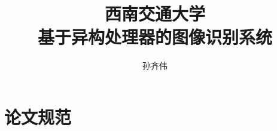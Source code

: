 \documentclass[bachelor]{swjtuthesis}
\title{西南交通大学\\基于异构处理器的图像识别系统}
\author{孙齐伟}
\begin{document}
\maketitle

%

\frontmatter

\tableofcontents
\listoffigures
\listoftables
% 


\mainmatter












\appendix

\chapter{论文规范}



\backmatter


\end{document}
